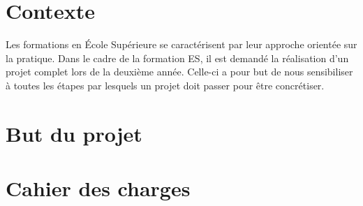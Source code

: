 \section{Contexte}

    Les formations en École Supérieure se caractérisent par leur approche orientée sur la pratique.
    Dans le cadre de la formation ES, il est demandé la réalisation d'un projet complet lors de la deuxième année. Celle-ci a pour but de nous sensibiliser à toutes les étapes par lesquels un projet doit passer pour être concrétiser.
   
    
\section{But du projet}
    \lipsum[1]

\section{Cahier des charges}

    \lipsum[1]
    \lipsum[1]